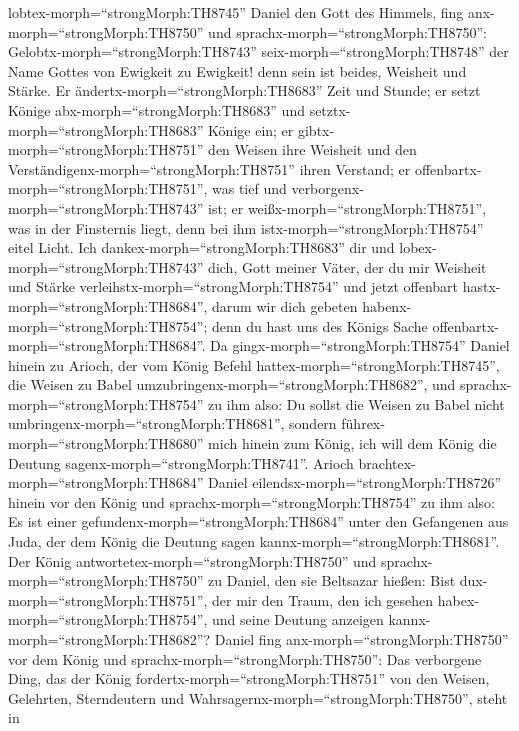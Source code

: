 lobtex-morph=``strongMorph:TH8745'' Daniel den Gott des Himmels, fing
anx-morph=``strongMorph:TH8750'' und
sprachx-morph=``strongMorph:TH8750'':
Gelobtx-morph=``strongMorph:TH8743'' seix-morph=``strongMorph:TH8748''
der Name Gottes von Ewigkeit zu Ewigkeit! denn sein ist beides, Weisheit
und Stärke.  Er ändertx-morph=``strongMorph:TH8683'' Zeit
und Stunde; er setzt Könige abx-morph=``strongMorph:TH8683'' und
setztx-morph=``strongMorph:TH8683'' Könige ein; er
gibtx-morph=``strongMorph:TH8751'' den Weisen ihre Weisheit und den
Verständigenx-morph=``strongMorph:TH8751'' ihren Verstand; 
er offenbartx-morph=``strongMorph:TH8751'', was tief und
verborgenx-morph=``strongMorph:TH8743'' ist; er
weißx-morph=``strongMorph:TH8751'', was in der Finsternis liegt, denn
bei ihm istx-morph=``strongMorph:TH8754'' eitel Licht.  Ich
dankex-morph=``strongMorph:TH8683'' dir und
lobex-morph=``strongMorph:TH8743'' dich, Gott meiner Väter, der du mir
Weisheit und Stärke verleihstx-morph=``strongMorph:TH8754'' und jetzt
offenbart hastx-morph=``strongMorph:TH8684'', darum wir dich gebeten
habenx-morph=``strongMorph:TH8754''; denn du hast uns des Königs Sache
offenbartx-morph=``strongMorph:TH8684''.  Da
gingx-morph=``strongMorph:TH8754'' Daniel hinein zu Arioch, der vom
König Befehl hattex-morph=``strongMorph:TH8745'', die Weisen zu Babel
umzubringenx-morph=``strongMorph:TH8682'', und
sprachx-morph=``strongMorph:TH8754'' zu ihm also: Du sollst die Weisen
zu Babel nicht umbringenx-morph=``strongMorph:TH8681'', sondern
führex-morph=``strongMorph:TH8680'' mich hinein zum König, ich will dem
König die Deutung sagenx-morph=``strongMorph:TH8741''. 
Arioch brachtex-morph=``strongMorph:TH8684'' Daniel
eilendsx-morph=``strongMorph:TH8726'' hinein vor den König und
sprachx-morph=``strongMorph:TH8754'' zu ihm also: Es ist einer
gefundenx-morph=``strongMorph:TH8684'' unter den Gefangenen aus Juda,
der dem König die Deutung sagen kannx-morph=``strongMorph:TH8681''.
 Der König antwortetex-morph=``strongMorph:TH8750'' und
sprachx-morph=``strongMorph:TH8750'' zu Daniel, den sie Beltsazar
hießen: Bist dux-morph=``strongMorph:TH8751'', der mir den Traum, den
ich gesehen habex-morph=``strongMorph:TH8754'', und seine Deutung
anzeigen kannx-morph=``strongMorph:TH8682''?  Daniel fing
anx-morph=``strongMorph:TH8750'' vor dem König und
sprachx-morph=``strongMorph:TH8750'': Das verborgene Ding, das der König
fordertx-morph=``strongMorph:TH8751'' von den Weisen, Gelehrten,
Sterndeutern und Wahrsagernx-morph=``strongMorph:TH8750'', steht in
